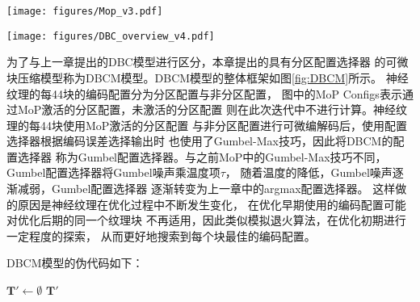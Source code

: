 \begin{figure*}[htbp]
    \centering
    \texttt{[image: figures/Mop\_v3.pdf]}
    \caption{基于混合专家模型的分区配置选择器(MoP)}
    \label{fig:Mop}
\end{figure*}

\begin{figure*}[htbp]
    \centering
    \texttt{[image: figures/DBC\_overview\_v4.pdf]}
    \caption{基于MoP的DBCM模型的整体框架}
    \label{fig:DBCM}
\end{figure*}

为了与上一章提出的DBC模型进行区分，本章提出的具有分区配置选择器
的可微块压缩模型称为DBCM模型。DBCM模型的整体框架如图\ref{fig:DBCM}所示。
神经纹理的每4\times4块的编码配置分为分区配置与非分区配置，
图中的MoP Configs表示通过MoP激活的分区配置，未激活的分区配置
则在此次迭代中不进行计算。神经纹理的每4\times4块使用MoP激活的分区配置
与非分区配置进行可微编解码后，使用配置选择器根据编码误差选择输出时
也使用了Gumbel-Max技巧，因此将DBCM的配置选择器
称为Gumbel配置选择器。与之前MoP中的Gumbel-Max技巧不同，
Gumbel配置选择器将Gumbel噪声乘温度项$\tau$，
随着温度的降低，Gumbel噪声逐渐减弱，Gumbel配置选择器
逐渐转变为上一章中的argmax配置选择器。
这样做的原因是神经纹理在优化过程中不断发生变化，
在优化早期使用的编码配置可能对优化后期的同一个纹理块
不再适用，因此类似模拟退火算法，在优化初期进行一定程度的探索，
从而更好地搜索到每个块最佳的编码配置。

DBCM模型的伪代码如下：

\begin{algorithm}[htbp]
    \caption{DBCM模型}
    $\mathbf{T}' \gets \emptyset$ \;
    \Return $\mathbf{T}'$
\end{algorithm}

